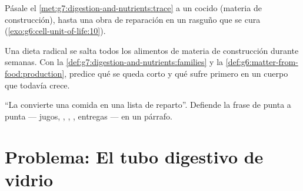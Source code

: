 \begin{exercise}[$\star\star$]\label{exo:g7:digestion-and-nutrients:10}
Pásale el \cref{met:g7:digestion-and-nutrients:trace} a un  cocido
(materia de construcción), hasta una obra de reparación en un rasguño
que se cura (\cref{exo:g6:cell-unit-of-life:10}).
\end{exercise}

\begin{exercise}[$\star\star$]\label{exo:g7:digestion-and-nutrients:11}
Una dieta radical se salta todos los alimentos de materia de
construcción durante semanas. Con la
\cref{def:g7:digestion-and-nutrients:families} y la
\cref{def:g6:matter-from-food:production}, predice qué se queda corto y
qué sufre primero en un cuerpo que todavía crece.
\end{exercise}

\begin{exercise}[$\star\star\star$]\label{exo:g7:digestion-and-nutrients:12}
``La  convierte una comida en una lista de reparto''. Defiende
la frase de punta a punta --- jugos, , , ,
entregas --- en un párrafo.
\end{exercise}

\section{Problema: El tubo digestivo de vidrio}

